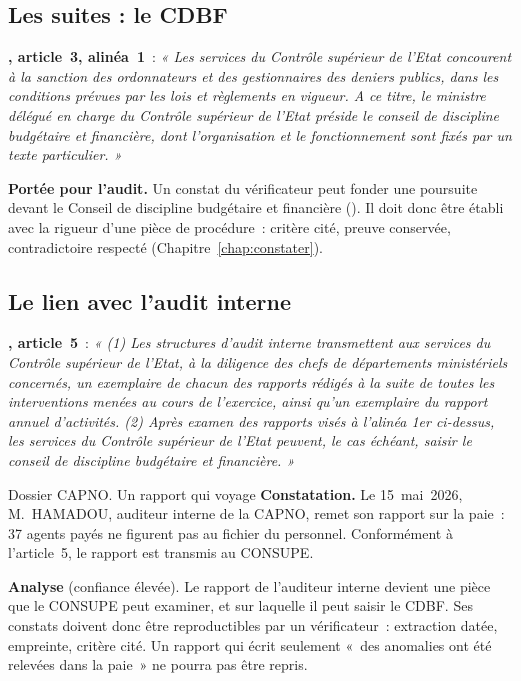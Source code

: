 \subsection{Les suites : le CDBF}

\begin{boxjuris}
\textbf{, article~3, alinéa~1}~: \textit{« Les
services du Contrôle supérieur de l'Etat concourent à la sanction des
ordonnateurs et des gestionnaires des deniers publics, dans les
conditions prévues par les lois et règlements en vigueur. A ce titre, le
ministre délégué en charge du Contrôle supérieur de l'Etat préside le
conseil de discipline budgétaire et financière, dont l'organisation et le
fonctionnement sont fixés par un texte particulier. »}

\medskip
\textbf{Portée pour l'audit.} Un constat du vérificateur peut fonder une
poursuite devant le Conseil de discipline budgétaire et financière
(). Il doit donc être établi avec la rigueur d'une pièce de
procédure~: critère cité, preuve conservée, contradictoire respecté
(Chapitre~\ref{chap:constater}).
\end{boxjuris}

\subsection{Le lien avec l'audit interne}

\begin{boxjuris}
\textbf{, article~5}~: \textit{« (1) Les
structures d'audit interne transmettent aux services du Contrôle supérieur
de l'Etat, à la diligence des chefs de départements ministériels
concernés, un exemplaire de chacun des rapports rédigés à la suite de
toutes les interventions menées au cours de l'exercice, ainsi qu'un
exemplaire du rapport annuel d'activités. (2) Après examen des rapports
visés à l'alinéa 1er ci-dessus, les services du Contrôle supérieur de
l'Etat peuvent, le cas échéant, saisir le conseil de discipline
budgétaire et financière. »}
\end{boxjuris}

\begin{boxscenario}{Dossier CAPNO. Un rapport qui voyage}
\textbf{Constatation.} Le 15~mai~2026, M.~HAMADOU, auditeur interne de la
CAPNO, remet son rapport sur la paie~: 37 agents payés ne figurent pas au
fichier du personnel. Conformément à l'article~5, le rapport est transmis
au CONSUPE.

\medskip
\textbf{Analyse} (confiance élevée). Le rapport de l'auditeur interne
devient une pièce que le CONSUPE peut examiner, et sur laquelle il peut
saisir le CDBF. Ses constats doivent donc être reproductibles par un
vérificateur~: extraction datée, empreinte, critère cité. Un rapport qui
écrit seulement «~des anomalies ont été relevées dans la paie~» ne pourra
pas être repris.
\end{boxscenario}

